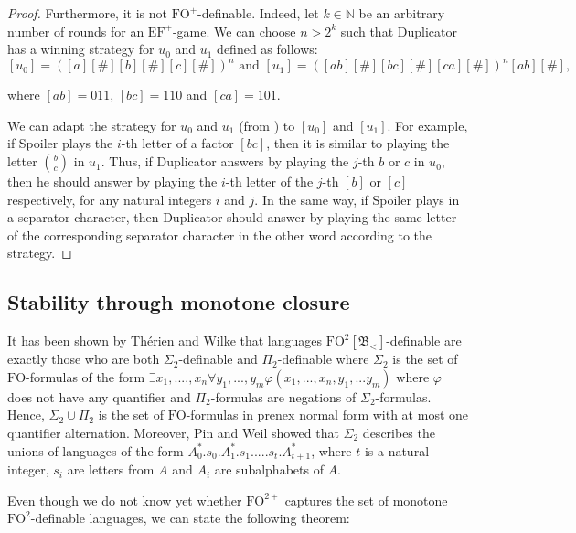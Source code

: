 \documentclass[a4paper,UKenglish,cleveref, autoref, thm-restate]{lipics-v2021}
\newcommand{\N}{\mathbb{N}}
\newcommand{\FO}{\mathrm{FO}}
\newcommand{\FOp}{\FO^+}
\newcommand{\FOtw}{\FO^2}
\newcommand{\FOtwp}{\FO^{2+}}
\newcommand{\EF}{\mathrm{EF}}
\newcommand{\bin}{\mathfrak{B}}
\begin{document}
\begin{proof}
Furthermore, it is not $\FOp$-definable.
Indeed, let $k\in\N$ be an arbitrary number of rounds for an $\EF^+$-game.
We can choose $n > 2^k$ such that Duplicator has a winning strategy for $u_0$ and $u_1$ defined as follows:
$$
[u_0] = ([a][\#][b][\#][c][\#])^n
\text{ and }
[u_1] = ([ab][\#][bc][\#][ca][\#])^n[ab][\#],
$$

where $[ab] = 011$, $[bc] = 110$ and $[ca] = 101$.

We can adapt the strategy for $u_0$ and $u_1$ (from \cite[Lemma 4.4]{PFO}) to $[u_0]$ and $[u_1]$.
For example, if Spoiler plays the $i$-th letter of a factor $[bc]$, then it is similar to playing the letter $\binom{b}{c}$ in $u_1$.
Thus, if Duplicator answers by playing the $j$-th $b$ or $c$ in $u_0$, then he should answer by playing the $i$-th letter of the $j$-th $[b]$ or $[c]$ respectively, for any natural integers $i$ and $j$.
In the same way, if Spoiler plays in a separator character, then Duplicator should answer by playing the same letter of the corresponding separator character in the other word according to the strategy.


\end{proof}



\subsection{Stability through monotone closure} \label{sec:stability}




It has been shown by Thérien and Wilke \cite{OneQuantifierAlternation} that languages $\FOtw[\bin_<]$-definable are exactly those who are both $\Sigma_2$-definable and $\Pi_2$-definable where $\Sigma_2$ is the set of $\FO$-formulas of the form $\exists x_1,....,x_n \forall y_1,...,y_m \varphi(x_1,...,x_n,y_1,...y_m)$ where $\varphi$ does not have any quantifier and $\Pi_2$-formulas are negations of $\Sigma_2$-formulas.
Hence, $\Sigma_2 \cup \Pi_2$ is the set of $\FO$-formulas in prenex normal form with at most one quantifier alternation.
Moreover, Pin and Weil \cite{PolynomialClosure} showed that $\Sigma_2$ describes the unions of languages of the form $A_0^*.s_0.A_1^*.s_1.....s_t.A_{t+1}^*$, where $t$ is a natural integer, $s_i$ are letters from $A$ and $A_i$ are subalphabets of $A$.

Even though we do not know yet whether $\FOtwp$ captures the set of monotone $\FOtw$-definable languages, we can state the following theorem:
\end{document}

